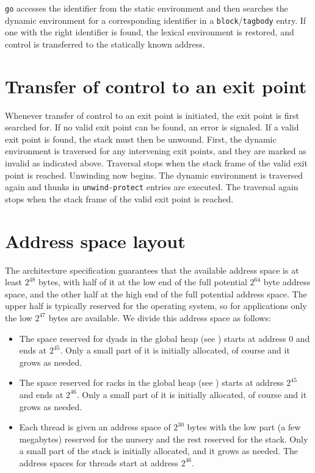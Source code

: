 \texttt{go} accesses the identifier from the static environment and
then searches the dynamic environment for a corresponding identifier
in a \texttt{block}/\texttt{tagbody} entry.  If one with the right
identifier is found, the lexical environment is restored, and control
is transferred to the statically known address.

\section{Transfer of control to an exit point}

Whenever transfer of control to an exit point is initiated, the exit
point is first searched for.  If no valid exit point can be found, an
error is signaled.  If a valid exit point is found, the stack must
then be unwound.  First, the dynamic environment is traversed for any
intervening exit points, and they are marked as invalid as indicated
above.  Traversal stops when the stack frame of the valid exit point
is reached.  Unwinding now begins.  The dynamic environment is
traversed again and thunks in \texttt{unwind-protect} entries are
executed.  The traversal again stops when the stack frame of the valid
exit point is reached.

\section{Address space layout}

The architecture specification guarantees that the available address
space is at least $2^{48}$ bytes, with half of it at the low end of
the full potential $2^{64}$ byte address space, and the other half at
the high end of the full potential address space.  The upper half is
typically reserved for the operating system, so for applications only
the low $2^{47}$ bytes are available.  We divide this address space as
follows:

\begin{itemize}
\item The space reserved for dyads in the global heap (see
  ) starts at address $0$ and ends at
  $2^{45}$.  Only a small part of it is initially allocated, of course
  and it grows as needed.
\item The space reserved for racks in the global heap (see
  ) starts at address $2^{45}$ and ends at
  $2^{46}$.  Only a small part of it is initially allocated, of course
  and it grows as needed.
\item Each thread is given an address space of $2^{30}$ bytes with the
  low part (a few megabytes) reserved for the nursery and the rest
  reserved for the stack.  Only a small part of the stack is initially
  allocated, and it grows as needed.  The address spaces for threads
  start at address $2^{46}$.
\end{itemize}

